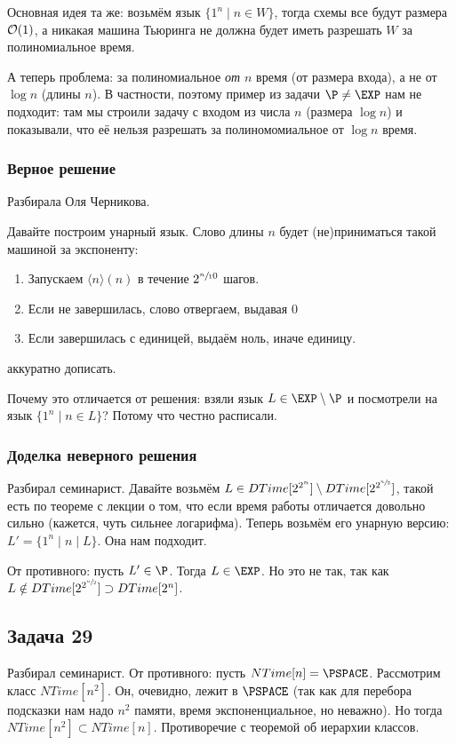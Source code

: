 		Основная идея та же: возьмём язык $\{1^n \mid n \in W\}$, тогда схемы все будут размера $\mathcal O(1)$,
		а никакая машина Тьюринга не должна будет иметь разрешать $W$ за полиномиальное время.

		А теперь проблема: за полиномиальное \textit{от $n$} время (от размера входа),
		а не от $\log n$ (длины $n$).
		В частности, поэтому пример из задачи $\P \neq \EXP$ нам не подходит:
		там мы строили задачу с входом из числа $n$ (размера $\log n$) и показывали,
		что её нельзя разрешать за полиномомиальное от $\log n$ время.

	\subsubsection{Верное решение}
		Разбирала Оля Черникова.

		Давайте построим унарный язык.
		Слово длины $n$ будет (не)приниматься такой машиной за экспоненту:
		\begin{enumerate}
			\item
				Запускаем $\langle n \rangle (n)$ в течение $2^{\sfrac n 10}$ шагов.
			\item
				Если не завершилась, слово отвергаем, выдавая 0
			\item
				Если завершилась с единицей, выдаём ноль, иначе единицу.
		\end{enumerate}
		\TODO аккуратно дописать.

		\begin{Rem}
			\TODO Почему это отличается от решения: взяли язык $L \in \EXP \setminus \P$ и посмотрели на язык $\{1^n \mid n \in L\}$?
			Потому что честно расписали.
		\end{Rem}

	\subsubsection{Доделка неверного решения}
		Разбирал семинарист.
		Давайте возьмём $L \in DTime[2^{2^n}] \setminus DTime[2^{2^{\sfrac n2}}]$,
		такой есть по теореме с лекции о том, что если время работы отличается довольно
		сильно (кажется, чуть сильнее логарифма).
		Теперь возьмём его унарную версию: $L' = \{ 1^n \mid n \mid L\}$.
		Она нам подходит.

		От противного: пусть $L' \in \P$.
		Тогда $L \in \EXP$.
		Но это не так, так как $L \notin DTime[2^{2^{\sfrac n2}}] \supset DTime[2^n]$.
		\TODO

\subsection{Задача 29}
	Разбирал семинарист.
	От противного: пусть $NTime[n] = \PSPACE$.
	Рассмотрим класс $NTime[n^2]$.
	Он, очевидно, лежит в $\PSPACE$ (так как для перебора подсказки нам надо $n^2$
	памяти, время экспоненциальное, но неважно).
	Но тогда $NTime[n^2] \subset NTime[n]$.
	Противоречие с теоремой об иерархии классов.

